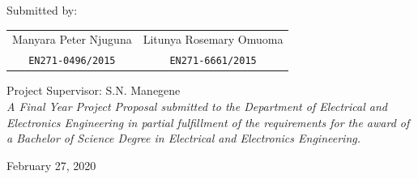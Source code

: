\begin{spacing}{1.1}
\begin{titlepage}
\begin{center}
		\vspace*{\fill}
		\large{Submitted by:}\\[-5pt]
		\begin{table}[h!]
			\centering
			\renewcommand{\arraystretch}{1.5}
			\begin{tabular}{c c}
				{ Manyara Peter Njuguna} &{ Litunya Rosemary Omuoma}\\
				\texttt{EN271-0496/2015} &\texttt{EN271-6661/2015}
			\end{tabular}
		\end{table}
		\vspace*{\fill}
		Project Supervisor: S.N. Manegene\\
		\vspace*{\fill}
		{\normalsize\itshape A Final Year Project Proposal submitted to the Department of Electrical and
		Electronics Engineering in partial fulfillment of the requirements for the award of a
		Bachelor of Science Degree in Electrical and Electronics Engineering.}
		
		\vspace*{\fill}
		\Large{February 27, 2020}
  \end{center}
\end{titlepage}
\end{spacing}